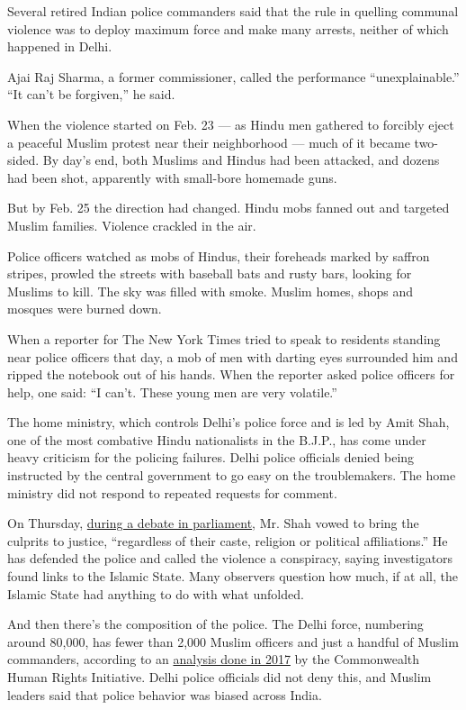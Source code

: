 Several retired Indian police commanders said that the rule in quelling
communal violence was to deploy maximum force and make many arrests,
neither of which happened in Delhi.

Ajai Raj Sharma, a former commissioner, called the performance
``unexplainable.'' ``It can't be forgiven,'' he said.

When the violence started on Feb. 23 --- as Hindu men gathered to
forcibly eject a peaceful Muslim protest near their neighborhood ---
much of it became two-sided. By day's end, both Muslims and Hindus had
been attacked, and dozens had been shot, apparently with small-bore
homemade guns.

But by Feb. 25 the direction had changed. Hindu mobs fanned out and
targeted Muslim families. Violence crackled in the air.

Police officers watched as mobs of Hindus, their foreheads marked by
saffron stripes, prowled the streets with baseball bats and rusty bars,
looking for Muslims to kill. The sky was filled with smoke. Muslim
homes, shops and mosques were burned down.

When a reporter for The New York Times tried to speak to residents
standing near police officers that day, a mob of men with darting eyes
surrounded him and ripped the notebook out of his hands. When the
reporter asked police officers for help, one said: ``I can't. These
young men are very volatile.''

The home ministry, which controls Delhi's police force and is led by
Amit Shah, one of the most combative Hindu nationalists in the B.J.P.,
has come under heavy criticism for the policing failures. Delhi police
officials denied being instructed by the central government to go easy
on the troublemakers. The home ministry did not respond to repeated
requests for comment.

On Thursday,
\href{https://twitter.com/bjp4india/status/1238089841469874178?s=21}{during
a debate in parliament}, Mr. Shah vowed to bring the culprits to
justice, ``regardless of their caste, religion or political
affiliations.'' He has defended the police and called the violence a
conspiracy, saying investigators found links to the Islamic State. Many
observers question how much, if at all, the Islamic State had anything
to do with what unfolded.

And then there's the composition of the police. The Delhi force,
numbering around 80,000, has fewer than 2,000 Muslim officers and just a
handful of Muslim commanders, according to an
\href{https://indianexpress.com/article/opinion/columns/muslims-in-delhi-police-jobs-delhi-police-recruitment-crime-in-delhi-national-crime-records-bureau-4936111/lite/}{analysis
done in 2017} by the Commonwealth Human Rights Initiative. Delhi police
officials did not deny this, and Muslim leaders said that police
behavior was biased across India.

